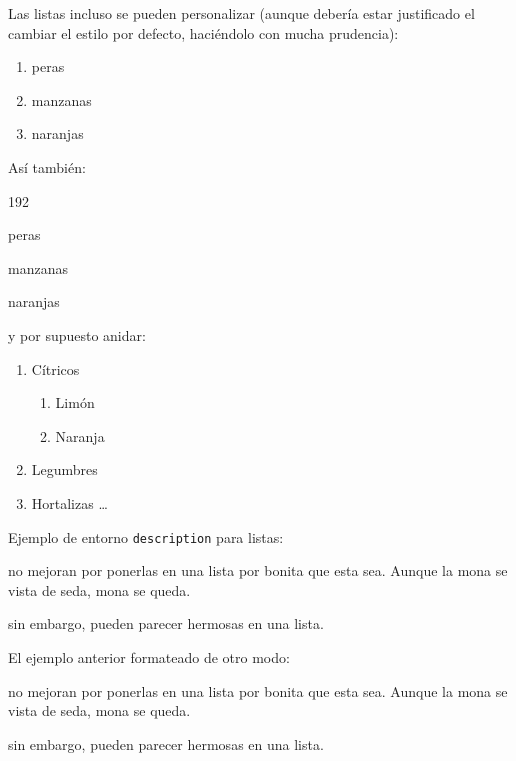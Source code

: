 \documentclass[ 		%
	11pt,				%
	a4paper,			%
	twoside,			%
	openright,			%
	final       		%
]{book}
\begin{document}
\noindent Las listas incluso se pueden personalizar (aunque debería estar justificado el cambiar el estilo por defecto, haciéndolo con mucha prudencia):

\begin{enumerate} %
	\item peras
	\item[\ding{55}] manzanas
	\item naranjas
\end{enumerate}


\noindent Así también:

\begin{dingautolist}{192} %
	\item peras
	\item manzanas
	\item naranjas
\end{dingautolist}


\noindent y por supuesto anidar:

\begin{enumerate}
  \item Cítricos
  \begin{enumerate}
    \item Limón
    \item Naranja
  \end{enumerate}
  \item Legumbres
  \item Hortalizas \ldots
\end{enumerate}


\noindent Ejemplo de entorno {\tt description} para listas:

\begin{description}[noitemsep]
	\item[Estupideces] no mejoran por ponerlas en una lista por bonita que esta sea. Aunque la mona se vista de seda, mona se queda.
	\item[Lucideces] sin embargo, pueden parecer hermosas en
	una lista.
\end{description}

\noindent El ejemplo anterior formateado de otro modo:

\begin{description}[style=nextline]
	\item[Estupideces] no mejoran por ponerlas en una lista por bonita que esta sea. Aunque la mona se vista de seda, mona se queda.
	\item[Lucideces] sin embargo, pueden parecer hermosas en una lista.
\end{description}
\end{document}
